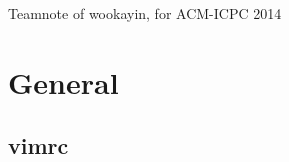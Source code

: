 \documentclass[11pt,landscape,a4paper,twocolumn]{article}
\newcommand{\inputsrc}[1]{
	\inputminted[fontsize=\scriptsize, mathescape, tabsize=4, linenos, numbersep=5pt]{cpp}{#1}
}
\newcommand{\Title}{Teamnote of wookayin, for ACM-ICPC 2014}
\begin{document}

\begin{center}
	\noindent
	\sf\Large
	\Title
\end{center}

\tableofcontents


\section{General}
\subsection{vimrc}
\inputsrc{src/basic/vimrc}
\end{document}
